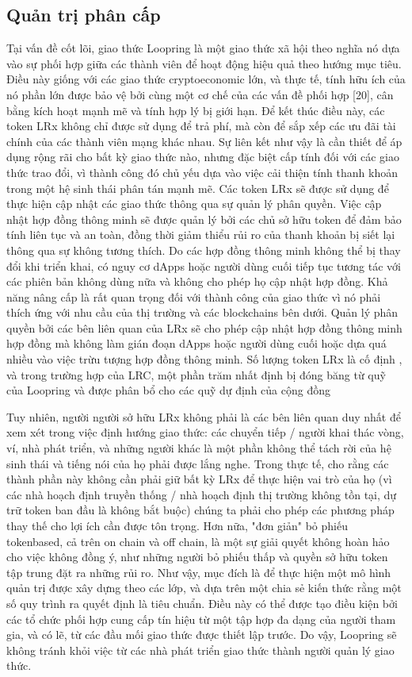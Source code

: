 \documentclass[12pt,a4paper]{article}
\begin{document}
\begin{multicols}{2}
\subsection{Quản trị phân cấp}
Tại vấn đề cốt lõi, giao thức Loopring là một giao thức xã hội theo nghĩa nó dựa vào sự phối hợp giữa các thành viên để hoạt động hiệu quả theo hướng mục tiêu. Điều này giống với các giao thức cryptoeconomic lớn, và thực tế, tính hữu ích của nó phần lớn được bảo vệ bởi cùng một cơ chế của các vấn đề phối hợp [20], cân bằng kích hoạt mạnh mẽ  và tính hợp lý bị giới hạn. Để kết thúc điều này, các token LRx không chỉ được sử dụng để trả phí, mà còn để sắp xếp các ưu đãi tài chính của các thành viên mạng khác nhau. Sự liên kết như vậy là cần thiết để áp dụng rộng rãi cho bất kỳ giao thức nào, nhưng đặc biệt cấp tính đối với các giao thức trao đổi, vì thành công đó chủ yếu dựa vào việc cải thiện tính thanh khoản trong một hệ sinh thái phân tán mạnh mẽ.
Các token LRx sẽ được sử dụng để thực hiện cập nhật các giao thức thông qua sự quản lý phân quyền. Việc cập nhật hợp đồng thông minh sẽ được quản lý bởi các chủ sở hữu token để đảm bảo tính liên tục và an toàn, đồng thời giảm thiểu rủi ro của thanh khoản bị siết lại thông qua sự không tương thích. Do các hợp đồng thông minh không thể bị thay đổi khi triển khai, có nguy cơ dApps hoặc người dùng cuối tiếp tục tương tác với các phiên bản không dùng nữa và không cho phép họ cập nhật hợp đồng. Khả năng nâng cấp là rất quan trọng đối với thành công của giao thức vì nó phải thích ứng với nhu cầu của thị trường và các blockchains bên dưới. Quản lý phân quyền bởi các bên liên quan của LRx sẽ cho phép cập nhật hợp đồng thông minh hợp đồng mà không làm gián đoạn dApps hoặc người dùng cuối hoặc dựa quá nhiều vào việc trừu tượng hợp đồng thông minh. Số lượng token LRx là cố định , và trong trường hợp của LRC, một phần trăm nhất định bị đóng băng từ quỹ của Loopring và được phân bổ cho các quỹ dự định của cộng đồng

Tuy nhiên, người người sở hữu LRx không phải là các bên liên quan duy nhất để xem xét trong việc định hướng giao thức: các chuyển tiếp / người khai thác vòng, ví, nhà phát triển, và những người khác là một phần không thể tách rời của hệ sinh thái và tiếng nói của họ phải được lắng nghe. Trong thực tế, cho rằng các thành phần này không cần phải giữ bất kỳ LRx để thực hiện vai trò của họ (vì các nhà hoạch định truyền thống / nhà hoạch định thị trường không tồn tại, dự trữ token ban đầu là không bắt buộc) chúng ta phải cho phép các phương pháp thay thế cho lợi ích cần được tôn trọng. Hơn nữa, "đơn giản" bỏ phiếu tokenbased, cả trên on chain và off chain, là một sự giải quyết không hoàn hảo cho việc không đồng ý, như những người bỏ phiếu thấp và quyền sở hữu token tập trung đặt ra những rủi ro. Như vậy, mục đích là để thực hiện một mô hình quản trị được xây dựng theo các lớp, và dựa trên một chia sẻ kiến thức rằng một số quy trình ra quyết định là tiêu chuẩn. Điều này có thể được tạo điều kiện bởi các tổ chức phối hợp cung cấp tín hiệu từ một tập hợp đa dạng của người tham gia, và có lẽ, từ các đầu mối giao thức được thiết lập trước. Do vậy, Loopring sẽ không tránh khỏi việc từ các nhà phát triển giao thức thành người quản lý giao thức.

\end{multicols}
\end{document}
